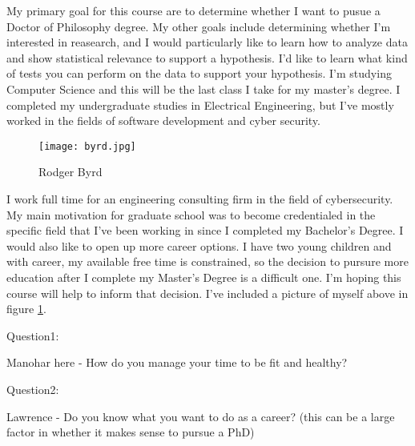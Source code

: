 My primary goal for this course are to determine whether I want to pusue a Doctor of Philosophy degree. My other goals include determining whether I'm interested in reasearch, and I would particularly like to learn how to analyze data and show statistical relevance to support a hypothesis. I'd like to learn what kind of tests you can perform on the data to support your hypothesis. I'm studying Computer Science and this will be the last class I take for my master's degree. I completed my undergraduate studies in Electrical Engineering, but I've mostly worked in the fields of software development and cyber security.
\begin{figure}
  \centerline{\texttt{[image: byrd.jpg]}}
  \caption{Rodger Byrd}
  \label{fig:HS}
\end{figure}
I work full time for an engineering consulting firm in the field of cybersecurity. My main motivation for graduate school was to become credentialed in the specific field that I've been working in since I completed my Bachelor's Degree. I would also like to open up more career options. I have two young children and with career, my available free time is constrained, so the decision to pursure more education after I complete my Master's Degree is a difficult one. I'm hoping this course will help to inform that decision. I've included a picture of myself above in figure \ref{fig:HS}.


Question1:

Manohar here - How do you manage your time to be fit and healthy?

Question2:

Lawrence - Do you know what you want to do as a career? (this can be a large factor in whether it makes sense to pursue a PhD)
